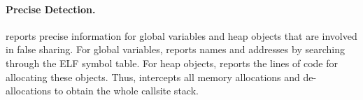 \paragraph{Precise Detection.} \Cheetah{} reports precise information for global variables and heap objects that are involved in false sharing. For global variables, \Cheetah{} reports names and addresses by searching through the ELF symbol table. For heap objects, \Cheetah{} reports the lines of code for allocating these objects. Thus, \Cheetah{} intercepts all memory allocations and de-allocations to obtain the whole callsite stack. 

 
